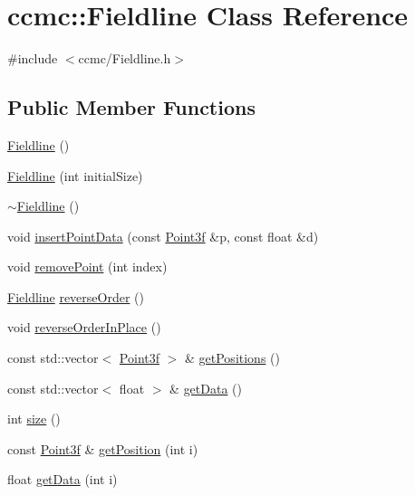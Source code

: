 \hypertarget{classccmc_1_1_fieldline}{\section{ccmc\-:\-:Fieldline Class Reference}
\label{classccmc_1_1_fieldline}
}


{\ttfamily \#include $<$ccmc/\-Fieldline.\-h$>$}

\subsection*{Public Member Functions}
\begin{DoxyCompactItemize}
\item 
\hyperlink{classccmc_1_1_fieldline_a10b0290c13c4170e468860dc2143fc20}{Fieldline} ()
\item 
\hyperlink{classccmc_1_1_fieldline_a981328dcb0f92191940ef86d76946457}{Fieldline} (int initial\-Size)
\item 
\hyperlink{classccmc_1_1_fieldline_a08964ce404b1cfd462c5d2038d7c1e9e}{$\sim$\-Fieldline} ()
\item 
void \hyperlink{classccmc_1_1_fieldline_a88a8fc4c0ad61639b9138f8dd57bf8e0}{insert\-Point\-Data} (const \hyperlink{classccmc_1_1_point3f}{Point3f} \&p, const float \&d)
\item 
void \hyperlink{classccmc_1_1_fieldline_a23509bcd88a0a7605c35afaafa58c5c9}{remove\-Point} (int index)
\item 
\hyperlink{classccmc_1_1_fieldline}{Fieldline} \hyperlink{classccmc_1_1_fieldline_a07884d34cad97f14b6810cf23ee003c0}{reverse\-Order} ()
\item 
void \hyperlink{classccmc_1_1_fieldline_a700a5c623e608f3cbc89455bc4e63b83}{reverse\-Order\-In\-Place} ()
\item 
const std\-::vector$<$ \hyperlink{classccmc_1_1_point3f}{Point3f} $>$ \& \hyperlink{classccmc_1_1_fieldline_a0d82bca39360b88914fc312dcb441fb8}{get\-Positions} ()
\item 
const std\-::vector$<$ float $>$ \& \hyperlink{classccmc_1_1_fieldline_af87fd7cd8f79631a255f64d40665fccf}{get\-Data} ()
\item 
int \hyperlink{classccmc_1_1_fieldline_abc4b63ac9b72acd2e6f26b51f659500c}{size} ()
\item 
const \hyperlink{classccmc_1_1_point3f}{Point3f} \& \hyperlink{classccmc_1_1_fieldline_a9f1b0541029d59589902e1ffe2ef75c5}{get\-Position} (int i)
\item 
float \hyperlink{classccmc_1_1_fieldline_afe04791c767345b742c4da719709ddf0}{get\-Data} (int i)

\end{DoxyCompactItemize}
